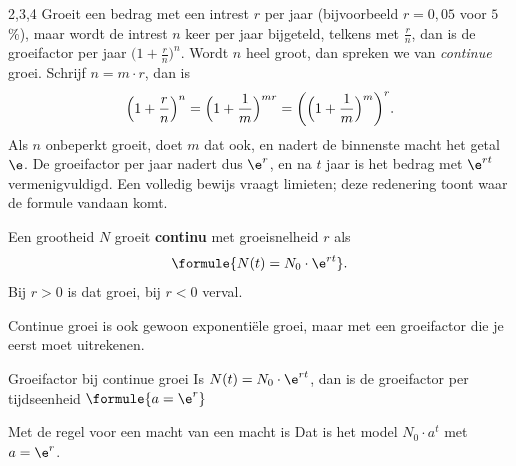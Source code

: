 \begin{alleenvoor}{2,3,4}
Groeit een bedrag met een intrest $r$ per jaar (bijvoorbeeld $r = 0{,}05$ voor $5$\,\%), maar wordt de intrest $n$ keer per jaar bijgeteld, telkens met $\frac{r}{n}$, dan is de groeifactor per jaar $\bigl(1 + \frac{r}{n}\bigr)^n$. Wordt $n$ heel groot, dan spreken we van \textit{continue} groei. Schrijf $n = m \cdot r$, dan is
\[\Bigl(1 + \frac{r}{n}\Bigr)^n = \Bigl(1 + \frac{1}{m}\Bigr)^{m r} = \biggl(\Bigl(1 + \frac{1}{m}\Bigr)^{m}\biggr)^{r} .\]
Als $n$ onbeperkt groeit, doet $m$ dat ook, en nadert de binnenste macht het getal $\e$. De groeifactor per jaar nadert dus $\e^r$, en na $t$ jaar is het bedrag met $\e^{rt}$ vermenigvuldigd. Een volledig bewijs vraagt limieten; deze redenering toont waar de formule vandaan komt.

\begin{theorie}
Een grootheid $N$ groeit \textbf{\textcolor{accent}{continu}} met groeisnelheid $r$ als
\[\formule{N(t) = N_0 \cdot \e^{rt}}.\]
Bij $r > 0$ is dat groei, bij $r < 0$ verval.
\end{theorie}


\begin{oefeningen}
\end{oefeningen}

Continue groei is ook gewoon exponentiële groei, maar met een groeifactor die je eerst moet uitrekenen.

\begin{theorie}
\begin{stelling}{Groeifactor bij continue groei}
Is $N(t) = N_0 \cdot \e^{rt}$, dan is de groeifactor per tijdseenheid \qquad $\formule{a = \e^r}$
\end{stelling}
\begin{bewijs}
Met de regel voor een macht van een macht is
Dat is het model $N_0 \cdot a^t$ met $a = \e^r$.
\end{bewijs}
\end{theorie}


\end{alleenvoor}
